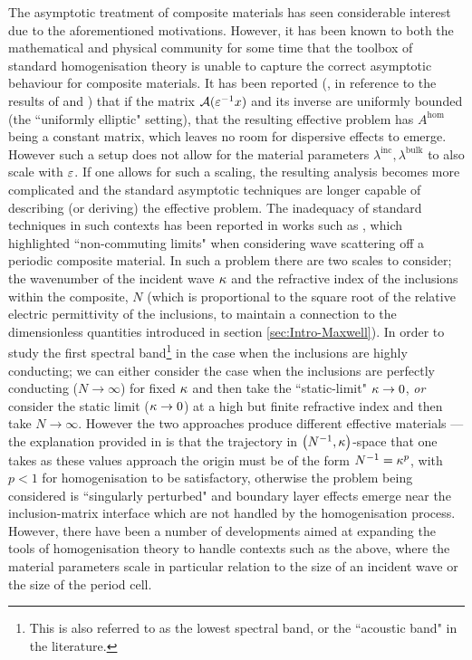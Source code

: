 The asymptotic treatment of composite materials has seen considerable interest due to the aforementioned motivations.
However, it has been known to both the mathematical and physical community for some time that the toolbox of standard homogenisation theory is unable to capture the correct asymptotic behaviour for composite materials.
It has been reported (\cite{cherednichenko2019unified}, in reference to the results of \cite{birman2004second} and \cite{zhikov1989spectral}) that if the matrix $\mathcal{A}(\varepsilon^{-1}x)$ and its inverse are uniformly bounded (the ``uniformly elliptic" setting), that the resulting effective problem has $A^{\mathrm{hom}}$ being a constant matrix, which leaves no room for dispersive effects to emerge.
However such a setup does not allow for the material parameters $\lambda^{\mathrm{inc}},\lambda^{\mathrm{bulk}}$ to also scale with $\varepsilon$.
If one allows for such a scaling, the resulting analysis becomes more complicated and the standard asymptotic techniques are longer capable of describing (or deriving) the effective problem.
The inadequacy of standard techniques in such contexts has been reported in works such as \cite{nicorovici1995photonic}, which highlighted ``non-commuting limits" when considering wave scattering off a periodic composite material.
In such a problem there are two scales to consider; the wavenumber of the incident wave $\kappa$ and the refractive index of the inclusions within the composite, $N$ (which is proportional to the square root of the relative electric permittivity of the inclusions, to maintain a connection to the dimensionless quantities introduced in section \ref{sec:Intro-Maxwell}).
In order to study the first spectral band\footnote{This is also referred to as the lowest spectral band, or the ``acoustic band" in the literature.} in the case when the inclusions are highly conducting; we can either consider the case when the inclusions are perfectly conducting ($N\rightarrow\infty$) for fixed $\kappa$ and then take the ``static-limit" $\kappa\rightarrow0$, \emph{or} consider the static limit ($\kappa\rightarrow0$) at a high but finite refractive index and then take $N\rightarrow\infty$.
However the two approaches produce different effective materials --- the explanation provided in \cite{movchan2001noncommuting} is that the trajectory in $\left( N^{-1},\kappa \right)$-space that one takes as these values approach the origin must be of the form $N^{-1}=\kappa^p$, with $p<1$ for homogenisation to be satisfactory, otherwise the problem being considered is ``singularly perturbed" and boundary layer effects emerge near the inclusion-matrix interface which are not handled by the homogenisation process.
However, there have been a number of developments aimed at expanding the tools of homogenisation theory to handle contexts such as the above, where the material parameters scale in particular relation to the size of an incident wave or the size of the period cell.

